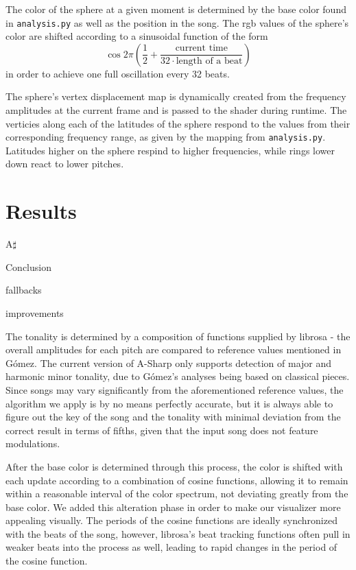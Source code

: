 \documentclass{article}
\newcommand{\code}{\texttt}
\begin{document}
The color of the sphere at a given moment is determined by the base color found in \code{analysis.py} as well as the position in the song. The rgb values of the sphere's color are shifted according to a sinusoidal function of the form
$$\cos 2 \pi \left( \frac{1}{2} + \frac{\text{current time}}{32 \cdot \text{length of a beat}} \right)$$
in order to achieve one full oscillation every 32 beats.

The sphere's vertex displacement map is dynamically created from the frequency amplitudes at the current frame and is passed to the shader during runtime. The verticies along each of the latitudes of the sphere respond to the values from their corresponding frequency range, as given by the mapping from \code{analysis.py}. Latitudes higher on the sphere respind to higher frequencies, while rings lower down react to lower pitches.

\section{Results}

A$\sharp$

Conclusion

fallbacks

improvements

The tonality is determined by a composition of functions supplied by librosa - the overall amplitudes for each pitch are compared to reference values mentioned in Gómez. The current version of A-Sharp only supports detection of major and harmonic minor tonality, due to Gómez's analyses being based on classical pieces. Since songs may vary significantly from the aforementioned reference values, the algorithm we apply is by no means perfectly accurate, but it is always able to figure out the key of the song and the tonality with minimal deviation from the correct result in terms of fifths, given that the input song does not feature modulations.

After the base color is determined through this process, the color is shifted with each update according to a combination of cosine functions, allowing it to remain within a reasonable interval of the color spectrum, not deviating greatly from the base color. We added this alteration phase in order to make our visualizer more appealing visually. The periods of the cosine functions are ideally synchronized with the beats of the song, however, librosa's beat tracking functions often pull in weaker beats into the process as well, leading to rapid changes in the period of the cosine function.
\end{document}
